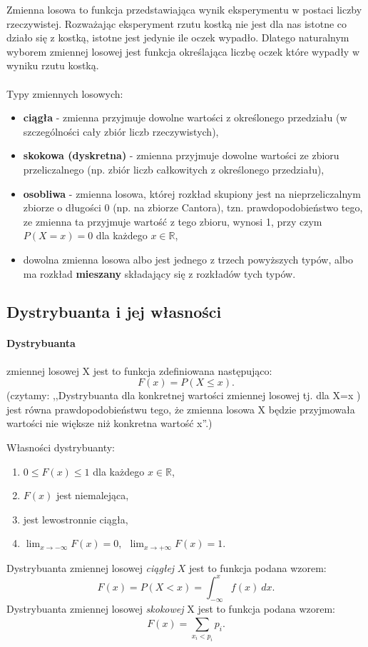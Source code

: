 \documentclass[a4paper,twoside]{report}
\begin{document}
Zmienna losowa to funkcja przedstawiająca wynik eksperymentu w postaci liczby rzeczywistej. Rozważając eksperyment rzutu kostką nie jest dla nas istotne co działo się z kostką, istotne jest jedynie ile oczek wypadło. Dlatego naturalnym wyborem zmiennej losowej jest funkcja określająca liczbę oczek które wypadły w wyniku rzutu kostką. \\\\
Typy zmiennych losowych:
\begin{itemize}
\item \textbf{ciągła} - zmienna przyjmuje dowolne wartości z określonego przedziału (w szczególności cały zbiór liczb rzeczywistych),
\item \textbf{skokowa (dyskretna)} - zmienna przyjmuje dowolne wartości ze zbioru przeliczalnego (np. zbiór liczb całkowitych z określonego przedziału),
\item \textbf{osobliwa} - zmienna losowa, której rozkład skupiony jest na nieprzeliczalnym zbiorze o długości 0 (np. na zbiorze Cantora), tzn. prawdopodobieństwo tego, ze zmienna ta przyjmuje wartość z tego zbioru, wynosi 1, przy czym $P(X = x) = 0$ dla każdego $x \in \mathbb{R}$,
\item dowolna zmienna losowa albo jest jednego z trzech powyższych typów, albo ma rozkład \textbf{mieszany} składający się z rozkładów tych typów.
\end{itemize}

\subsection{Dystrybuanta i jej własności}
\paragraph{Dystrybuanta} zmiennej losowej X  jest to funkcja zdefiniowana następująco:
\begin{equation}
F(x) = P(X \le x).
\end{equation}
(czytamy: ,,Dystrybuanta dla konkretnej wartości zmiennej losowej tj. dla X=x ) jest równa prawdopodobieństwu tego, że zmienna losowa X będzie przyjmowała wartości nie większe niż konkretna wartość  x''.)

Własności dystrybuanty:
\begin{enumerate}
\item $0 \le F(x) \le 1$ dla każdego $x \in \mathbb{R}$,
\item $F(x)$ jest niemalejąca,
\item jest lewostronnie ciągła,
\item $\lim_{x \to - \infty} F(x) = 0, ~~\lim_{x \to + \infty} F(x) = 1.$
\end{enumerate}
\medskip
Dystrybuanta zmiennej losowej \emph{ciągłej} $X$ jest to funkcja podana wzorem:
\begin{equation}
F(x) = P(X < x) = \int_{-\infty}^{x} f(x)~dx.
\end{equation}
\medskip
Dystrybuanta zmiennej losowej \emph{skokowej} X jest to funkcja podana wzorem:
\begin{equation}
F(x)=\sum_{x_i < p_i}^{} p_i.
\end{equation}
\end{document}

